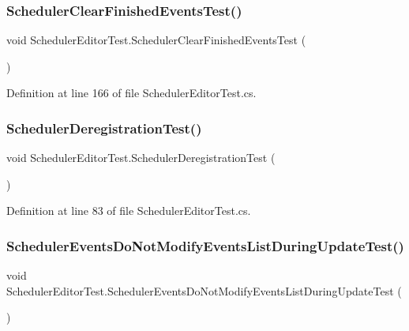 \subsubsection{\texorpdfstring{Scheduler\+Clear\+Finished\+Events\+Test()}{SchedulerClearFinishedEventsTest()}}
{\footnotesize\ttfamily void Scheduler\+Editor\+Test.\+Scheduler\+Clear\+Finished\+Events\+Test (\begin{DoxyParamCaption}{ }\end{DoxyParamCaption})}



Definition at line 166 of file Scheduler\+Editor\+Test.\+cs.

\mbox{\label{class_scheduler_editor_test_a146364bf766fb03e8525072455e2515d}} 
\subsubsection{\texorpdfstring{Scheduler\+Deregistration\+Test()}{SchedulerDeregistrationTest()}}
{\footnotesize\ttfamily void Scheduler\+Editor\+Test.\+Scheduler\+Deregistration\+Test (\begin{DoxyParamCaption}{ }\end{DoxyParamCaption})}



Definition at line 83 of file Scheduler\+Editor\+Test.\+cs.

\mbox{\label{class_scheduler_editor_test_a362e86415c4e22b78d3114c631377231}} 
\subsubsection{\texorpdfstring{Scheduler\+Events\+Do\+Not\+Modify\+Events\+List\+During\+Update\+Test()}{SchedulerEventsDoNotModifyEventsListDuringUpdateTest()}}
{\footnotesize\ttfamily void Scheduler\+Editor\+Test.\+Scheduler\+Events\+Do\+Not\+Modify\+Events\+List\+During\+Update\+Test (\begin{DoxyParamCaption}{ }\end{DoxyParamCaption})}



